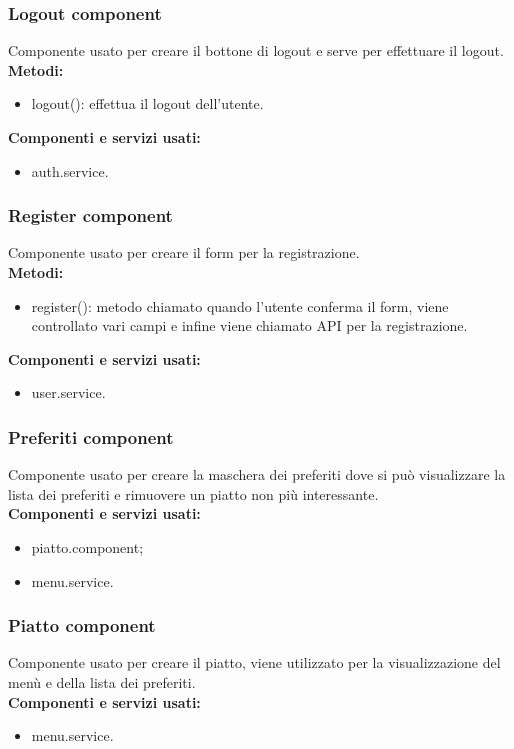\subsubsection{Logout component}
Componente usato per creare il bottone di logout e serve per effettuare il logout.\\
\textbf{Metodi:}
\begin{itemize}
    \item logout(): effettua il logout dell'utente.
\end{itemize}
\textbf{Componenti e servizi usati:}
\begin{itemize}
    \item auth.service.
\end{itemize}

\subsubsection{Register component}
Componente usato per creare il form per la registrazione.\\
\textbf{Metodi:}
\begin{itemize}
    \item register(): metodo chiamato quando l'utente conferma il form, viene controllato vari campi e infine viene chiamato API per la registrazione.
\end{itemize}
\textbf{Componenti e servizi usati:}
\begin{itemize}
    \item user.service.
\end{itemize}

\subsubsection{Preferiti component}
Componente usato per creare la maschera dei preferiti dove si può visualizzare la lista dei preferiti e rimuovere un piatto non più interessante.\\
\textbf{Componenti e servizi usati:}
\begin{itemize}
    \item piatto.component;
    \item menu.service.
\end{itemize}

\subsubsection{Piatto component}
Componente usato per creare il piatto, viene utilizzato per la visualizzazione del menù e della lista dei preferiti.\\
\textbf{Componenti e servizi usati:}
\begin{itemize}
    \item menu.service.
\end{itemize}

